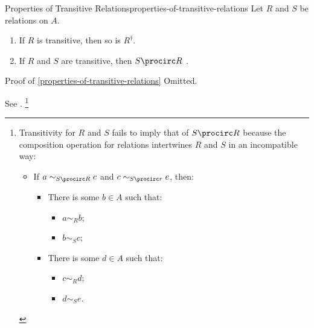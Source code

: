 \begin{proposition}{Properties of Transitive Relations}{properties-of-transitive-relations}%
    Let $R$ and $S$ be relations on $A$.
    \begin{enumerate}
        \item\label{properties-of-transitive-relations-interaction-with-inverses}If $R$ is transitive, then so is $R^{\dagger}$.
        \item\label{properties-of-transitive-relations-interaction-with-composition}If $R$ and $S$ are transitive, then $S\procirc R$ .
    \end{enumerate}
\end{proposition}
\begin{Proof}{Proof of \cref{properties-of-transitive-relations}}%
    Omitted.

    See \cite{MSE2096272}.%
    \footnote{%
        Transitivity for $R$ and $S$ fails to imply that of $S\procirc R$ because the composition operation for relations intertwines $R$ and $S$ in an incompatible way:
        \begin{itemize}
            \item If $a\sim_{S\procirc R}c$ and $c\sim_{S\procirc r}e$, then:
                \begin{itemize}
                    \item There is some $b\in A$ such that:
                        \begin{itemize}
                            \item $a\sim_{R}b$;
                            \item $b\sim_{S}c$;
                        \end{itemize}
                    \item There is some $d\in A$ such that:
                        \begin{itemize}
                            \item $c\sim_{R}d$;
                            \item $d\sim_{S}e$.
                        \end{itemize}
                \end{itemize}
        \end{itemize}
        \par\vspace*{\TCBBoxCorrection}
    }%
\end{Proof}
